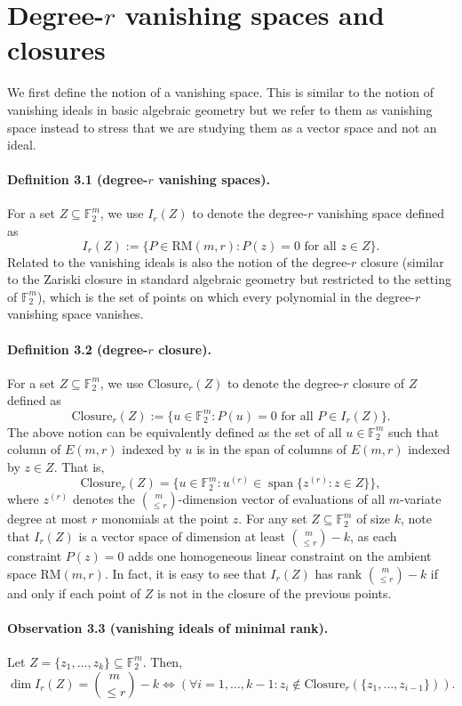 \section*{Degree-$r$ vanishing spaces and closures}
We first define the notion of a vanishing space. This is similar to the notion of vanishing ideals in basic algebraic geometry but we refer to them as vanishing space instead to stress that we are studying them as a vector space and not an ideal.
\paragraph{Definition 3.1 (degree-$r$ vanishing spaces).} For a set $Z\subseteq\mathbb F_2^m$, we use $I_r(Z)$ to denote the degree-$r$ vanishing space defined as
\[I_r(Z):=\{P\in\mathrm{RM}(m,r):P(z)=0\text{ for all }z\in Z\}.\]
Related to the vanishing ideals is also the notion of the degree-$r$ closure (similar to the Zariski closure in standard algebraic geometry but restricted to the setting of $\mathbb F_2^m$), which is the set of points on which every polynomial in the degree-$r$ vanishing space vanishes.
\paragraph{Definition 3.2 (degree-$r$ closure).} For a set $Z\subseteq\mathbb F_2^m$, we use $\mathrm{Closure}_r(Z)$ to denote the degree-$r$ closure of $Z$ defined as
\[\mathrm{Closure}_r(Z):=\{u\in\mathbb F_2^m:P(u)=0\text{ for all }P\in I_r(Z)\}.\]
The above notion can be equivalently defined as the set of all $u\in\mathbb F_2^m$ such that column of $E(m,r)$ indexed by $u$ is in the span of columns of $E(m,r)$ indexed by $z\in Z$. That is,
\[\mathrm{Closure}_r(Z)=\{u\in\mathbb F_2^m:u^{(r)}\in\operatorname{span}\{z^{(r)}:z\in Z\}\},\]
where $z^{(r)}$ denotes the $\binom m{\le r}$-dimension vector of evaluations of all $m$-variate degree at most $r$ monomials at the point $z$. For any set $Z\subseteq\mathbb F_2^m$ of size $k$, note that $I_r(Z)$ is a vector space of dimension at least $\binom m{\le r}-k$, as each constraint $P(z)=0$ adds one homogeneous linear constraint on the ambient space $\mathrm{RM}(m,r)$. In fact, it is easy to see that $I_r(Z)$ has rank $\binom m{\le r}-k$ if and only if each point of $Z$ is not in the closure of the previous points.
\paragraph{Observation 3.3 (vanishing ideals of minimal rank).} Let $Z=\{z_1,\ldots,z_k\}\subseteq\mathbb F_2^m$. Then,
\[\dim I_r(Z)=\binom m{\le r}-k\iff(\forall i=1,\ldots,k-1:z_i\notin\mathrm{Closure}_r(\{z_1,\ldots,z_{i-1}\})).\]
